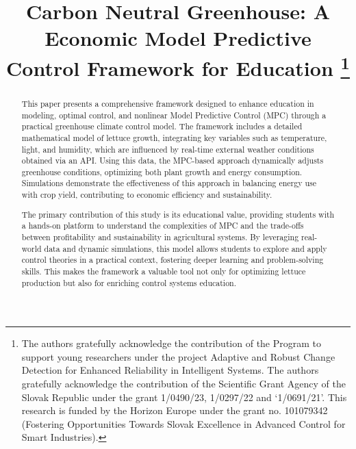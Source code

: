 \documentclass[conference]{IEEEtran}
\begin{document}
\title{Carbon Neutral Greenhouse: A Economic Model Predictive Control Framework for Education
    \thanks{The authors gratefully acknowledge the contribution of the Program to support young researchers under the project Adaptive and Robust Change Detection for Enhanced Reliability in Intelligent Systems. The authors gratefully acknowledge the contribution of the Scientific Grant Agency of the Slovak Republic under the grant 1/0490/23, 1/0297/22 and `1/0691/21'. This research is funded by the Horizon Europe under the grant no. 101079342 (Fostering Opportunities Towards Slovak Excellence in Advanced Control for Smart Industries).}
}

\author{
}

\maketitle

\begin{abstract}
	This paper presents a comprehensive framework designed to enhance education in modeling, optimal control, and nonlinear Model Predictive Control (MPC) through a practical greenhouse climate control model. The framework includes a detailed mathematical model of lettuce growth, integrating key variables such as temperature, light, and humidity, which are influenced by real-time external weather conditions obtained via an API. Using this data, the MPC-based approach dynamically adjusts greenhouse conditions, optimizing both plant growth and energy consumption. Simulations demonstrate the effectiveness of this approach in balancing energy use with crop yield, contributing to economic efficiency and sustainability.
	
	The primary contribution of this study is its educational value, providing students with a hands-on platform to understand the complexities of MPC and the trade-offs between profitability and sustainability in agricultural systems. By leveraging real-world data and dynamic simulations, this model allows students to explore and apply control theories in a practical context, fostering deeper learning and problem-solving skills. This makes the framework a valuable tool not only for optimizing lettuce production but also for enriching control systems education.
	\newline
\end{abstract}
\end{document}
